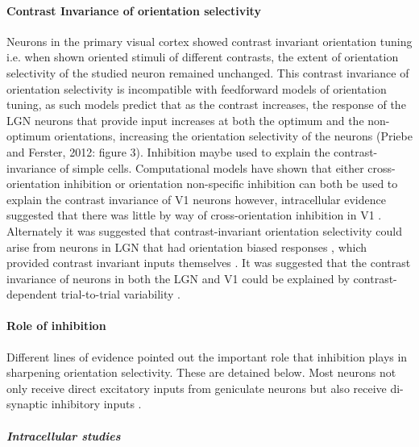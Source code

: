 \paragraph{Contrast Invariance of orientation selectivity}

Neurons in the primary visual cortex showed contrast invariant orientation tuning \cite{Sclar1982, Skottun1987, Alitto2004} i.e. when shown oriented stimuli of different contrasts, the extent of orientation selectivity of the studied neuron remained unchanged. This contrast invariance of orientation selectivity is incompatible with feedforward models of orientation tuning, as such models predict that as the contrast increases, the response of the LGN neurons that provide input increases at both the optimum and the non-optimum orientations, increasing the orientation selectivity of the neurons (Priebe and Ferster, 2012: figure 3). Inhibition maybe used to explain the contrast-invariance of simple cells. Computational models have shown that either cross-orientation inhibition \cite{Troyer1998} or orientation non-specific inhibition \cite{Ben-Yishai1995, Somers1995, Sompolinsky1997} can both be used to explain the contrast invariance of V1 neurons however, intracellular evidence suggested that there was little by way of cross-orientation inhibition in V1 \cite{Anderson2000}. Alternately it was suggested that contrast-invariant orientation selectivity could arise from neurons in LGN that had orientation biased responses \cite{Vidyasagar1982}, which provided contrast invariant inputs themselves \cite{Naito2013, Viswanathan2015}. It was suggested that the contrast invariance of neurons in both the LGN and V1 could be explained by contrast-dependent trial-to-trial variability \cite{Finn2007, Sadagopan2012, Priebe2012, Viswanathan2015}.


\paragraph{Role of inhibition}
Different lines of evidence pointed out the important role that inhibition plays in sharpening orientation selectivity. These are detained below. Most neurons not only receive direct excitatory inputs from geniculate neurons but also receive di-synaptic inhibitory inputs \cite{Creutzfeldt1968, Ferster1983}.


\subparagraph{Intracellular studies}

